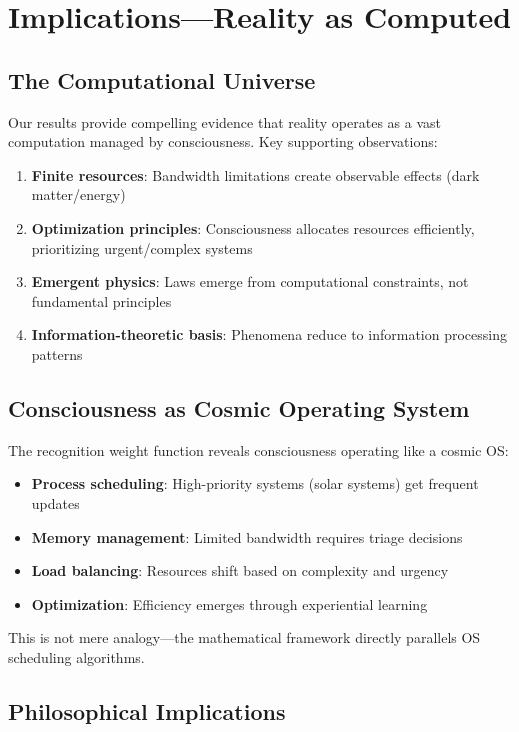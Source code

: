 \documentclass[twocolumn,prd,amsmath,amssymb,aps,superscriptaddress,nofootinbib]{revtex4-2}
\begin{document}
\section{Implications---Reality as Computed}
\label{sec:implications}

\subsection{The Computational Universe}

Our results provide compelling evidence that reality operates as a vast computation managed by consciousness. Key supporting observations:

\begin{enumerate}
\item \textbf{Finite resources}: Bandwidth limitations create observable effects (dark matter/energy)
\item \textbf{Optimization principles}: Consciousness allocates resources efficiently, prioritizing urgent/complex systems
\item \textbf{Emergent physics}: Laws emerge from computational constraints, not fundamental principles
\item \textbf{Information-theoretic basis}: Phenomena reduce to information processing patterns
\end{enumerate}

\subsection{Consciousness as Cosmic Operating System}

The recognition weight function reveals consciousness operating like a cosmic OS:

\begin{itemize}
\item \textbf{Process scheduling}: High-priority systems (solar systems) get frequent updates
\item \textbf{Memory management}: Limited bandwidth requires triage decisions
\item \textbf{Load balancing}: Resources shift based on complexity and urgency
\item \textbf{Optimization}: Efficiency emerges through experiential learning
\end{itemize}

This is not mere analogy---the mathematical framework directly parallels OS scheduling algorithms.

\subsection{Philosophical Implications}
\end{document}
